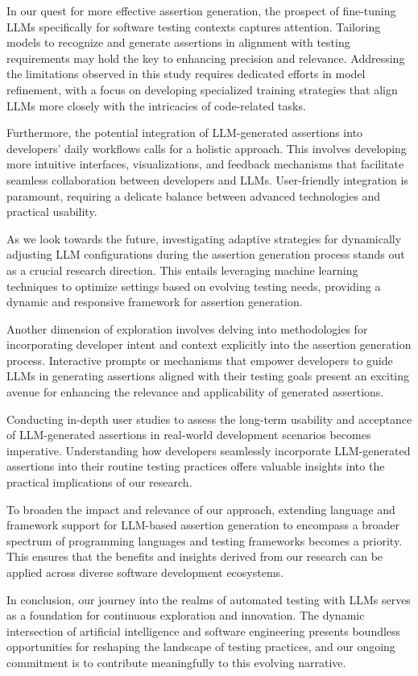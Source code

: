 In our quest for more effective assertion generation, the prospect of fine-tuning LLMs specifically for software testing contexts captures attention. Tailoring models to recognize and generate assertions in alignment with testing requirements may hold the key to enhancing precision and relevance. Addressing the limitations observed in this study requires dedicated efforts in model refinement, with a focus on developing specialized training strategies that align LLMs more closely with the intricacies of code-related tasks.

Furthermore, the potential integration of LLM-generated assertions into developers' daily workflows calls for a holistic approach. This involves developing more intuitive interfaces, visualizations, and feedback mechanisms that facilitate seamless collaboration between developers and LLMs. User-friendly integration is paramount, requiring a delicate balance between advanced technologies and practical usability.

As we look towards the future, investigating adaptive strategies for dynamically adjusting LLM configurations during the assertion generation process stands out as a crucial research direction. This entails leveraging machine learning techniques to optimize settings based on evolving testing needs, providing a dynamic and responsive framework for assertion generation.

Another dimension of exploration involves delving into methodologies for incorporating developer intent and context explicitly into the assertion generation process. Interactive prompts or mechanisms that empower developers to guide LLMs in generating assertions aligned with their testing goals present an exciting avenue for enhancing the relevance and applicability of generated assertions.

Conducting in-depth user studies to assess the long-term usability and acceptance of LLM-generated assertions in real-world development scenarios becomes imperative. Understanding how developers seamlessly incorporate LLM-generated assertions into their routine testing practices offers valuable insights into the practical implications of our research.

To broaden the impact and relevance of our approach, extending language and framework support for LLM-based assertion generation to encompass a broader spectrum of programming languages and testing frameworks becomes a priority. This ensures that the benefits and insights derived from our research can be applied across diverse software development ecosystems.

In conclusion, our journey into the realms of automated testing with LLMs serves as a foundation for continuous exploration and innovation. The dynamic intersection of artificial intelligence and software engineering presents boundless opportunities for reshaping the landscape of testing practices, and our ongoing commitment is to contribute meaningfully to this evolving narrative.